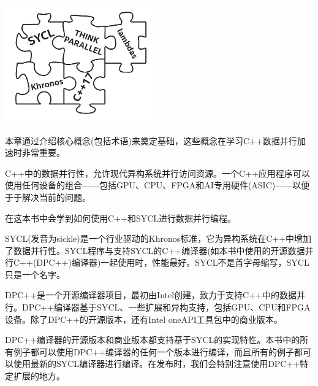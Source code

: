 \begin{center}
	\includegraphics[width=0.5\textwidth]{content/chapter-1/images/1}
\end{center}

本章通过介绍核心概念(包括术语)来奠定基础，这些概念在学习C++数据并行加速时非常重要。\par

C++中的数据并行性，允许现代异构系统并行访问资源。一个C++应用程序可以使用任何设备的组合——包括GPU、CPU、FPGA和AI专用硬件(ASIC)——以便于于解决当前的问题。\par

在这本书中会学到如何使用C++和SYCL进行数据并行编程。\par

SYCL(发音为sickle)是一个行业驱动的Khronos标准，它为异构系统在C++中增加了数据并行性。SYCL程序与支持SYCL的C++编译器(如本书中使用的开源数据并行C++(DPC++)编译器)一起使用时，性能最好。SYCL不是首字母缩写，SYCL只是一个名字。\par

DPC++是一个开源编译器项目，最初由Intel创建，致力于支持C++中的数据并行。DPC++编译器基于SYCL、一些扩展和异构支持，包括GPU、CPU和FPGA设备。除了DPC++的开源版本，还有Intel oneAPI工具包中的商业版本。\par

DPC++编译器的开源版本和商业版本都支持基于SYCL的实现特性。本书中的所有例子都可以使用DPC++编译器的任何一个版本进行编译，而且所有的例子都可以使用最新的SYCL编译器进行编译。在发布时，我们会特别注意使用DPC++特定扩展的地方。\par

